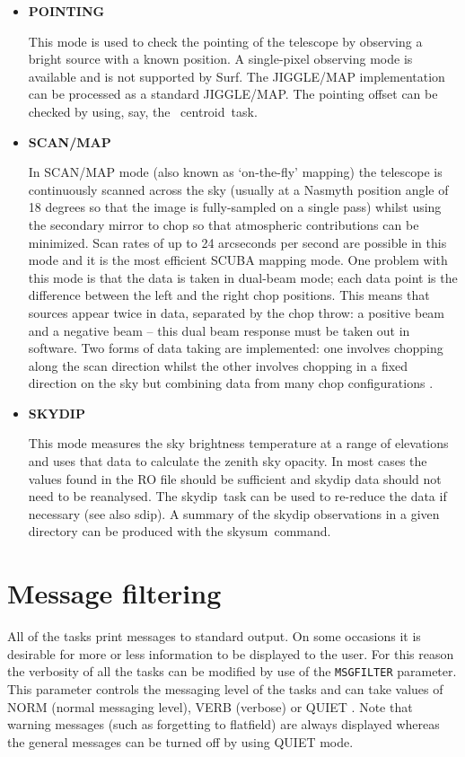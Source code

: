 \documentclass[twoside,11pt]{article}
\newcommand{\scusoft}          {{\sc Surf}}
\newcommand{\Kappa}{\xref{{\sc{Kappa}}}{sun95}{}}
\newcommand{\task}[1]{{\sf #1}}
\newcommand{\param}[1]{{\tt #1}}
\newcommand{\skydip}{\htmlref{\task{skydip}}{SKYDIP}}
\newcommand{\skysum}{\htmlref{\task{skysum}}{SKYSUM}}
\newcommand{\sdip}{\htmlref{\task{sdip}}{SDIP}}
\newcommand{\centroid}{\xref{\task{centroid}}{sun95}{CENTROID}}
\newcommand{\htmlref}[2]{#1}
\newcommand{\xref}[3]{#1}
\renewcommand{\_}{\texttt{\symbol{95}}}
\begin{document}
\begin{itemize}
\item {\bf POINTING}

This mode is used to check the pointing of the telescope by observing a bright
source with a known position. A single-pixel observing mode is available and
is not supported by \scusoft. The JIGGLE/MAP implementation can be processed
as a standard JIGGLE/MAP. The pointing offset can be checked by using, say,
the \Kappa\ \centroid\ task.

\item {\bf SCAN/MAP}

In SCAN/MAP mode (also known as `on-the-fly' mapping) the telescope is
continuously scanned across the sky (usually at a Nasmyth position angle of 18
degrees so that the image is fully-sampled on a single pass) whilst using the
secondary mirror to chop so that atmospheric 
contributions can be minimized. Scan rates of up to 24 arcseconds per second
are possible in this mode and it is the most efficient SCUBA mapping mode.
One problem with this mode is that the data is taken in dual-beam mode; each
data point is the difference between the left and the right chop positions.
This means that sources appear twice in data, separated by the chop throw:
a positive beam and a negative beam -- this dual beam response must
be taken out in software. Two forms of data taking are implemented: one
involves chopping along the scan direction \cite{ekh} whilst the
other involves chopping in a fixed direction on the sky but combining
data from many chop configurations \cite{EII,spietj}.

\item {\bf SKYDIP}

This mode measures the sky brightness temperature at a range of elevations and
uses that data to calculate the zenith sky opacity. In most cases the values
found in the RO file should be sufficient and skydip data should not need to
be reanalysed.  The \skydip\ task can be used to re-reduce the data
if necessary (see also \sdip). A summary of the skydip observations in a given 
directory can be produced with the \skysum\ command.

\end{itemize}

\section{Message filtering}

All of the tasks print messages to standard output. On some occasions it
is desirable for more or less information to be displayed to the user.
For this reason the verbosity of all the tasks can be modified by use of 
the \param{MSG\_FILTER} parameter. This parameter controls the messaging
level of the tasks and can take values of NORM (normal messaging level),
VERB (verbose) or QUIET \cite{mers}. Note that warning messages (such 
as forgetting to flatfield) are always displayed whereas the general messages
can be turned off by using QUIET mode.
\end{document}
